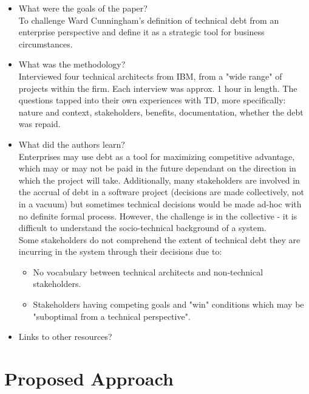 \documentclass{mprop}
\begin{document}
\begin{itemize}
	\item What were the goals of the paper? \\
	      To challenge Ward Cunningham's definition of technical debt from an
	      enterprise perspective and define it as a strategic tool for
	      business circumstances.
	\item What was the methodology? \\
	      Interviewed four technical architects from IBM, from a "wide range"
	      of projects within the firm. Each interview was approx. 1 hour in
	      length. The questions tapped into their own experiences with TD,
	      more specifically: nature and context, stakeholders, benefits,
	      documentation, whether the debt was repaid.
	\item What did the authors learn? \\
	      Enterprises may use debt as a tool for maximizing competitive
	      advantage, which may or may not be paid in the future dependant on
	      the direction in which the project will take. Additionally, many
	      stakeholders are involved in the accrual of debt in a software
	      project (decisions are made collectively, not in a vacuum) but
	      sometimes technical decisions would be made ad-hoc with no definite
	      formal process. However, the challenge is in the collective - it is
	      difficult to understand the socio-technical background of a system.
	      \\

	      Some stakeholders do not comprehend the extent of technical debt
	      they are incurring in the system through their decisions due to:
	      \begin{itemize}
		      \item No vocabulary between technical architects and
		      non-technical stakeholders.
		      \item Stakeholders having competing goals and "win" conditions
		      which may be "suboptimal from a technical perspective".
	      \end{itemize}
	\item Links to other resources?
\end{itemize}

\section{Proposed Approach}
\end{document}
